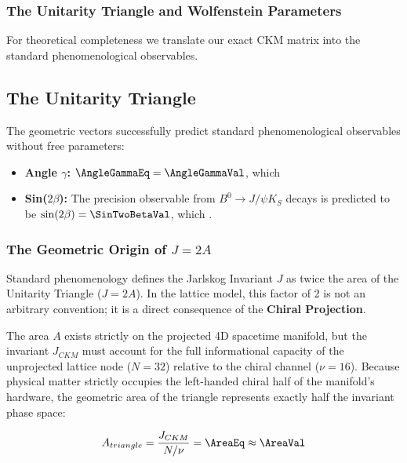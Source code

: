 \subsubsection{The Unitarity Triangle and Wolfenstein Parameters}

For theoretical completeness we translate our exact CKM matrix into the standard phenomenological observables.


\subsection{The Unitarity Triangle}
The geometric vectors successfully predict standard phenomenological observables without free parameters:

\begin{itemize}
    \item \textbf{Angle $\gamma$:} $\AngleGammaEq = \AngleGammaVal$, which \AngleGammaAccText
    \item \textbf{Sin($2\beta$):} The precision observable from $B^0 \to J/\psi K_S$ decays is predicted to be $\sin(2\beta) = \SinTwoBetaVal$, which \SinTwoBetaAccText.
\end{itemize}

\subsubsection{The Geometric Origin of $J = 2A$}
Standard phenomenology defines the Jarlskog Invariant $J$ as twice the area of the Unitarity Triangle ($J = 2A$). In the lattice model, this factor of 2 is not an arbitrary convention; it is a direct consequence of the \textbf{Chiral Projection}.

The area $A$ exists strictly on the projected 4D spacetime manifold, but the invariant $J_{CKM}$ must account for the full informational capacity of the unprojected lattice node ($N = 32$) relative to the chiral channel ($\nu = 16$). Because physical matter strictly occupies the left-handed chiral half of the manifold's hardware, the geometric area of the triangle represents exactly half the invariant phase space:

\begin{equation}
    A_{triangle} = \frac{J_{CKM}}{N/\nu} = \AreaEq \approx \mathbf{\AreaVal}
\end{equation}

